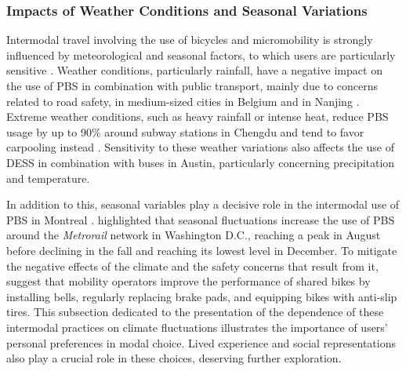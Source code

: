 \begin{refsegment}
\subsubsection*{Impacts of Weather Conditions and Seasonal Variations
    \label{chap2:impacts-meteo-saisons}
    }

Intermodal travel involving the use of bicycles and micromobility is strongly influenced by meteorological and seasonal factors, to which users are particularly sensitive \textcolor{blue}{\autocite[81]{flamm_determinants_2013}}. Weather conditions, particularly rainfall, have a negative impact on the use of \acrshort{PBS} in combination with public transport, mainly due to concerns related to road safety, in medium-sized cities in Belgium \textcolor{blue}{\autocite[8]{adnan_last-mile_2019}} and in Nanjing \textcolor{blue}{\autocite[67]{ma_understanding_2018}}. Extreme weather conditions, such as heavy rainfall or intense heat, reduce \acrshort{PBS} usage by up to 90\% around subway stations in Chengdu and tend to favor carpooling instead \textcolor{blue}{\autocite[889]{bi_analysis_2021}}. Sensitivity to these weather variations also affects the use of \acrshort{DESS} in combination with buses in Austin, particularly concerning precipitation and temperature.%

In addition to this, seasonal variables play a decisive role in the intermodal use of \acrshort{PBS} in Montreal \textcolor{blue}{\autocite[111]{bachand-marleau_much-anticipated_2011}}. \textcolor{blue}{\textcite[377]{ma_estimating_2019}} highlighted that seasonal fluctuations increase the use of \acrshort{PBS} around the \textsl{Metrorail} network in Washington D.C., reaching a peak in August before declining in the fall and reaching its lowest level in December. To mitigate the negative effects of the climate and the safety concerns that result from it, \textcolor{blue}{\textcite[68]{ma_understanding_2018}} suggest that mobility operators improve the performance of shared bikes by installing bells, regularly replacing brake pads, and equipping bikes with anti-slip tires. This subsection dedicated to the presentation of the dependence of these intermodal practices on climate fluctuations illustrates the importance of users' personal preferences in modal choice. Lived experience and social representations also play a crucial role in these choices, deserving further exploration.%


\end{refsegment}
